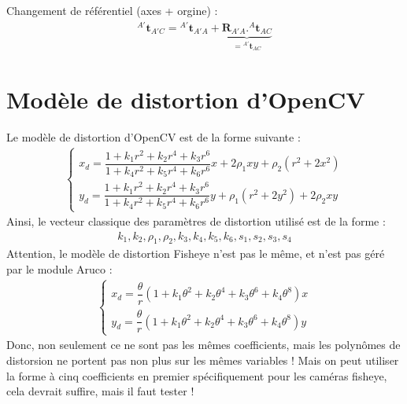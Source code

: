 \documentclass[a4paper]{article}
\begin{document}
Changement de référentiel (axes + orgine) :
\begin{align}
{}^{A'}\bm{t}_{A'C} = {}^{A'}\bm{t}_{A'A} + \underset{={}^{A'}\bm{t}_{AC}}{\underbrace{\bm{R}_{A'A}.{}^A\bm{t}_{AC}}}
\end{align}

\section{Modèle de distortion d'OpenCV}

Le modèle de distortion d'OpenCV est de la forme suivante :
\begin{align*}
\left\{\begin{array}{l}
x_d = \dfrac{1 + k_1r^2 + k_2r^4 + k_3r^6}{1 + k_4 r^2 + k_5r^4 + k_6r^6}x + 2\rho_1xy + \rho_2(r^2 + 2x^2)\\[1em]
y_d = \dfrac{1 + k_1r^2 + k_2r^4 + k_3r^6}{1 + k_4 r^2 + k_5r^4 + k_6r^6}y + \rho_1(r^2 + 2y^2) + 2\rho_2xy
\end{array}\right.
\end{align*}
Ainsi, le vecteur classique des paramètres de distortion utilisé est de la forme :
\begin{align*}
k_1, k_2, \rho_1, \rho_2, k_3, k_4, k_5, k_6, s_1, s_2, s_3, s_4
\end{align*}
Attention, le modèle de distortion Fisheye n'est pas le même, et n'est pas géré par le module Aruco :
\begin{align*}
\left\{\begin{array}{l}
x_d = \dfrac{\theta}{r}(1 + k_1\theta^2 + k_2\theta^4 + k_3\theta^6 + k_4\theta^8)x\\[1em]
y_d = \dfrac{\theta}{r}(1 + k_1\theta^2 + k_2\theta^4 + k_3\theta^6 + k_4\theta^8)y
\end{array}\right.
\end{align*}
Donc, non seulement ce ne sont pas les mêmes coefficients, mais les polynômes de distorsion ne portent
pas non plus sur les mêmes variables ! Mais on peut utiliser la forme à cinq coefficients en premier
spécifiquement pour les caméras fisheye, cela devrait suffire, mais il faut tester !
\end{document}
